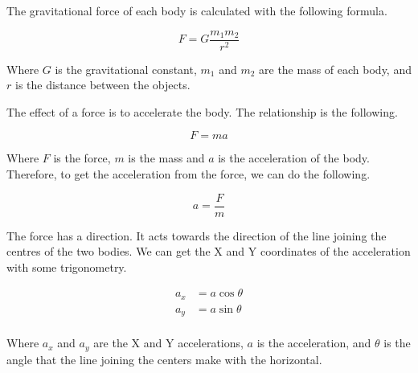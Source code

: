 \documentclass{amsart}
\begin{document}
The gravitational force of each body is calculated with the following formula.

\begin{displaymath}
  F = G \frac{m_1m_2}{r^2}
\end{displaymath}

Where $G$ is the gravitational constant, $m_1$ and $m_2$ are the mass of
each body, and $r$ is the distance between the objects.

The effect of a force is to accelerate the body. The relationship is the
following.

\begin{displaymath}
  F = m a
\end{displaymath}

Where $F$ is the force, $m$ is the mass and $a$ is the acceleration of
the body. Therefore, to get the acceleration from the force, we can do the
following.

\begin{displaymath}
  a = \frac{F}{m}
\end{displaymath}

The force has a direction. It acts towards the direction of the line joining
the centres of the two bodies. We can get the X and Y coordinates of the
acceleration with some trigonometry.

\begin{align*}
  a_x &= a \cos \theta \\
  a_y &= a \sin \theta \\
\end{align*}

Where $a_x$ and $a_y$ are the X and Y accelerations, $a$ is the
acceleration, and $\theta$ is the angle that the line joining the centers make
with the horizontal.
\end{document}
